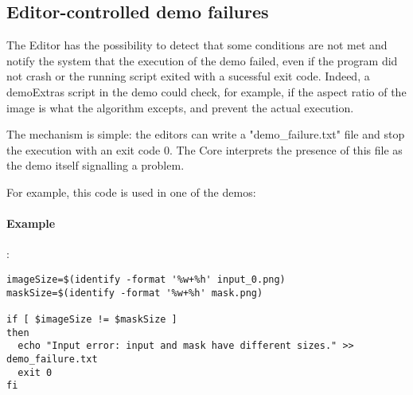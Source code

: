 \subsection{Editor-controlled demo failures}
The Editor has the possibility to detect that some conditions are not met and notify the system that the execution of the demo failed, even if the program did not crash or the running script exited with a sucessful exit code. Indeed, a demoExtras script in the demo could check, for example, if the aspect ratio of the image is what the algorithm excepts, and prevent the actual execution.

The mechanism is simple: the editors can write a "demo\_failure.txt" file and stop the execution with an exit
code 0. The Core interprets the presence of this file as the demo itself signalling a problem.

For example, this code is used in one of the demos:
\paragraph{Example}:\\
\begin{verbatim}
imageSize=$(identify -format '%w+%h' input_0.png)
maskSize=$(identify -format '%w+%h' mask.png)

if [ $imageSize != $maskSize ]
then
  echo "Input error: input and mask have different sizes." >> demo_failure.txt
  exit 0
fi
\end{verbatim} 
